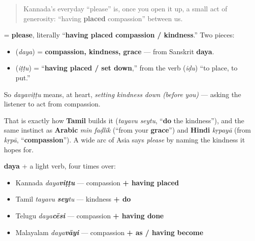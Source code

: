 \label{lesson:KA-C08-dayavittu}



\begin{quote}
Kannada's everyday \textquotedblleft{}please\textquotedblright{} is, once you open it up, a small act of generosity: \textquotedblleft{}having \textbf{placed} compassion\textquotedblright{} between us.
\end{quote}

\begin{cousinweb}
\textbf{} = \textbf{please}, literally \textquotedblleft{}\textbf{having placed compassion / kindness}.\textquotedblright{} Two pieces:

\begin{itemize}
\raggedright
  \item \textbf{} (\emph{daya}) = \textbf{compassion, kindness, grace} — from Sanskrit \textbf{daya}.
  \item \textbf{} (\emph{iṭṭu}) = \textquotedblleft{}\textbf{having placed / set down},\textquotedblright{} from the verb \textbf{} (\emph{iḍu}) \textquotedblleft{}to place, to put.\textquotedblright{}
\end{itemize}

So \emph{dayaviṭṭu} means, at heart, \emph{setting kindness down (before you)} — asking the listener to act from compassion.

That is exactly how \textbf{Tamil} builds it (\emph{tayavu seytu}, \textquotedblleft{}\textbf{do} the kindness\textquotedblright{}), and the same instinct as \textbf{Arabic} \emph{min faḍlik} (\textquotedblleft{}from your \textbf{grace}\textquotedblright{}) and \textbf{Hindi} \emph{kṛpayā} (from \emph{kṛpā}, \textquotedblleft{}\textbf{compassion}\textquotedblright{}). A wide arc of Asia says \emph{please} by naming the kindness it hopes for.
\end{cousinweb}

\begin{cousinweb}
\textbf{daya} + a light verb, four times over:

\begin{itemize}
\raggedright
  \item Kannada \textbf{} \emph{daya\textbf{viṭṭu}} — compassion \textbf{+ having placed}
  \item Tamil \textbf{} \emph{tayavu \textbf{sey}tu} — kindness \textbf{+ do}
  \item Telugu \textbf{} \emph{daya\textbf{cēsi}} — compassion \textbf{+ having done}
  \item Malayalam \textbf{} \emph{daya\textbf{vāyi}} — compassion \textbf{+ as / having become}
\end{itemize}
\end{cousinweb}

